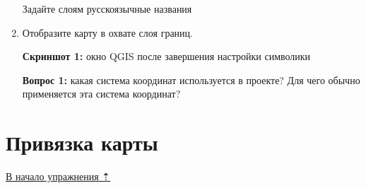 \documentclass[
  12pt,
]{book}
\begin{document}
\begin{enumerate}
  Задайте слоям русскоязычные названия
\item
  Отобразите карту в охвате слоя границ.

  \textbf{Скриншот 1:} окно QGIS после завершения настройки символики

  \textbf{Вопрос 1:} какая система координат используется в проекте? Для чего обычно применяется эта система координат?
\end{enumerate}

\hypertarget{map-ref-districts-referencing}{%
\section{Привязка карты}\label{map-ref-districts-referencing}}

\protect\hyperlink{map-ref-districts}{В начало упражнения ⇡}
\end{document}
